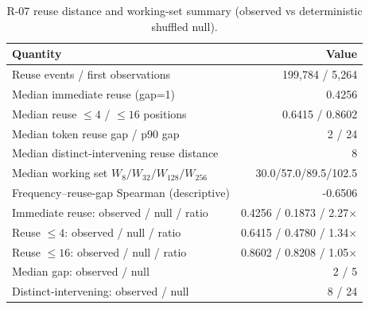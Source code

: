 \begin{table}[t]
\centering
\caption{R-07 reuse distance and working-set summary (observed vs deterministic shuffled null).}
\label{tab:r2-07-summary}
\small
\begin{tabular}{@{}lr@{}}
\toprule
Quantity & Value \\
\midrule
Reuse events / first observations & 199,784 / 5,264 \\
Median immediate reuse (gap=1) & 0.4256 \\
Median reuse $\le 4$ / $\le 16$ positions & 0.6415 / 0.8602 \\
Median token reuse gap / p90 gap & 2 / 24 \\
Median distinct-intervening reuse distance & 8 \\
Median working set $W_8/W_{32}/W_{128}/W_{256}$ & 30.0/57.0/89.5/102.5 \\
Frequency--reuse-gap Spearman (descriptive) & -0.6506 \\
Immediate reuse: observed / null / ratio & 0.4256 / 0.1873 / 2.27$\times$ \\
Reuse $\le 4$: observed / null / ratio & 0.6415 / 0.4780 / 1.34$\times$ \\
Reuse $\le 16$: observed / null / ratio & 0.8602 / 0.8208 / 1.05$\times$ \\
Median gap: observed / null & 2 / 5 \\
Distinct-intervening: observed / null & 8 / 24 \\
\bottomrule
\end{tabular}
\end{table}
